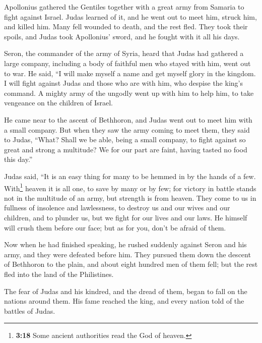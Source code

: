  Apollonius gathered the Gentiles together with a great
army from Samaria to fight against Israel.  Judas learned
of it, and he went out to meet him, struck him, and killed him. Many
fell wounded to death, and the rest fled.  They took
their spoils, and Judas took Apollonius' sword, and he fought with it
all his days.

 Seron, the commander of the army of Syria, heard that
Judas had gathered a large company, including a body of faithful men who
stayed with him, went out to war.  He said, ``I will make
myself a name and get myself glory in the kingdom. I will fight against
Judas and those who are with him, who despise the king's command.
 A mighty army of the ungodly went up with him to help
him, to take vengeance on the children of Israel.

 He came near to the ascent of Bethhoron, and Judas went
out to meet him with a small company.  But when they saw
the army coming to meet them, they said to Judas, ``What? Shall we be
able, being a small company, to fight against so great and strong a
multitude? We for our part are faint, having tasted no food this day.''

 Judas said, ``It is an easy thing for many to be hemmed
in by the hands of a few. With\footnote{\textbf{3:18} Some ancient
  authorities read the God of heaven.} heaven it is all one, to save by
many or by few;  for victory in battle stands not in the
multitude of an army, but strength is from heaven.  They
come to us in fullness of insolence and lawlessness, to destroy us and
our wives and our children, and to plunder us,  but we
fight for our lives and our laws.  He himself will crush
them before our face; but as for you, don't be afraid of them.

 Now when he had finished speaking, he rushed suddenly
against Seron and his army, and they were defeated before him.
 They pursued them down the descent of Bethhoron to the
plain, and about eight hundred men of them fell; but the rest fled into
the land of the Philistines.

 The fear of Judas and his kindred, and the dread of
them, began to fall on the nations around them.  His fame
reached the king, and every nation told of the battles of Judas.

